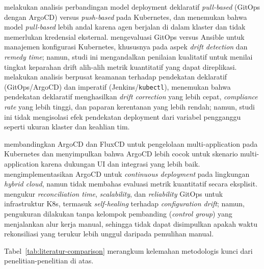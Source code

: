\citet{utami2021analysis} melakukan analisis perbandingan model deployment deklaratif \textit{pull-based} (GitOps dengan ArgoCD) versus \textit{push-based} pada Kubernetes, dan menemukan bahwa model \textit{pull-based} lebih andal karena agen berjalan di dalam klaster dan tidak memerlukan kredensial eksternal. \citet{shrestha2024configuration} mengevaluasi GitOps versus Ansible untuk manajemen konfigurasi Kubernetes, khususnya pada aspek \textit{drift detection} dan \textit{remedy time}; namun, studi ini mengandalkan penilaian kualitatif untuk menilai tingkat keparahan drift alih-alih metrik kuantitatif yang dapat direplikasi. \citet{kaggantinataraja2025security} melakukan analisis berpusat keamanan terhadap pendekatan deklaratif (GitOps/ArgoCD) dan imperatif (Jenkins/\texttt{kubectl}), menemukan bahwa pendekatan deklaratif menghasilkan \textit{drift correction} yang lebih cepat, \textit{compliance rate} yang lebih tinggi, dan paparan kerentanan yang lebih rendah; namun, studi ini tidak mengisolasi efek pendekatan deployment dari variabel pengganggu seperti ukuran klaster dan keahlian tim.

\citet{paavola2021managing} membandingkan ArgoCD dan FluxCD untuk pengelolaan multi-application pada Kubernetes dan menyimpulkan bahwa ArgoCD lebih cocok untuk skenario multi-application karena dukungan UI dan integrasi yang lebih baik. \citet{damore2021gitops} mengimplementasikan ArgoCD untuk \textit{continuous deployment} pada lingkungan \textit{hybrid cloud}, namun tidak membahas evaluasi metrik kuantitatif secara eksplisit. \citet{matubber2025managing} mengukur \textit{reconciliation time}, \textit{scalability}, dan \textit{reliability} GitOps untuk infrastruktur K8s, termasuk \textit{self-healing} terhadap \textit{configuration drift}; namun, pengukuran dilakukan tanpa kelompok pembanding (\textit{control group}) yang menjalankan alur kerja manual, sehingga tidak dapat disimpulkan apakah waktu rekonsiliasi yang terukur lebih unggul daripada pemulihan manual.

Tabel~\ref{tab:literatur-comparison} merangkum kelemahan metodologis kunci dari penelitian-penelitian di atas.

